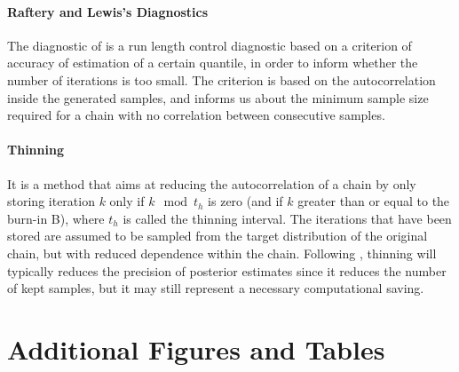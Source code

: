 \paragraph*{Raftery and Lewis’s Diagnostics}
The diagnostic of \citet{raftery1992}  is a run length control diagnostic based on a criterion of accuracy of estimation of a certain quantile, in order to inform whether the number of iterations is too small. The criterion is based on the autocorrelation inside the generated samples, and informs us about the minimum sample size required for a chain with no correlation between consecutive samples.


\paragraph*{Thinning} It is a method that aims at reducing the autocorrelation of a chain by only storing iteration $k$ only if $k\mod t_h$ is zero (and if $k$ greater than or equal to the burn-in B), where $t_h$ is called the thinning interval.
The iterations that have been stored are assumed to be sampled from the target distribution of the original chain, but with reduced dependence within the chain.
Following \citet{bay_thin_2012}, thinning will typically reduces the precision of posterior estimates since it reduces the number of kept samples, but it may still represent a necessary computational saving.



\section{Additional Figures and Tables}\label{app:bayfig}

